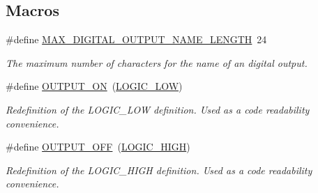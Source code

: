 \subsection*{Macros}
\begin{DoxyCompactItemize}
\item 
\hypertarget{group__digital__output_ga95c04964ce488ee74ca3f32a39a88cb7}{\#define \hyperlink{group__digital__output_ga95c04964ce488ee74ca3f32a39a88cb7}{M\-A\-X\-\_\-\-D\-I\-G\-I\-T\-A\-L\-\_\-\-O\-U\-T\-P\-U\-T\-\_\-\-N\-A\-M\-E\-\_\-\-L\-E\-N\-G\-T\-H}~24}\label{group__digital__output_ga95c04964ce488ee74ca3f32a39a88cb7}

\begin{DoxyCompactList}\small\item\em The maximum number of characters for the name of an digital output. \end{DoxyCompactList}\item 
\hypertarget{group__digital__output_ga43583966bde63db2887f604cf5787741}{\#define \hyperlink{group__digital__output_ga43583966bde63db2887f604cf5787741}{O\-U\-T\-P\-U\-T\-\_\-\-O\-N}~(\hyperlink{group__board__channel__constants_ggaee574a0d48c41a3e5426ffbf8ac4c5c4ab4d04526d504d52286c0125def0faef4}{L\-O\-G\-I\-C\-\_\-\-L\-O\-W})}\label{group__digital__output_ga43583966bde63db2887f604cf5787741}

\begin{DoxyCompactList}\small\item\em Redefinition of the L\-O\-G\-I\-C\-\_\-\-L\-O\-W definition. Used as a code readability convenience. \end{DoxyCompactList}\item 
\hypertarget{group__digital__output_ga514fc5ac6ead9d3aee8ae8fc8188a1d3}{\#define \hyperlink{group__digital__output_ga514fc5ac6ead9d3aee8ae8fc8188a1d3}{O\-U\-T\-P\-U\-T\-\_\-\-O\-F\-F}~(\hyperlink{group__board__channel__constants_ggaee574a0d48c41a3e5426ffbf8ac4c5c4ad49fd7cec8a5997c9347759048470fc9}{L\-O\-G\-I\-C\-\_\-\-H\-I\-G\-H})}\label{group__digital__output_ga514fc5ac6ead9d3aee8ae8fc8188a1d3}

\begin{DoxyCompactList}\small\item\em Redefinition of the L\-O\-G\-I\-C\-\_\-\-H\-I\-G\-H definition. Used as a code readability convenience. \end{DoxyCompactList}\end{DoxyCompactItemize}
